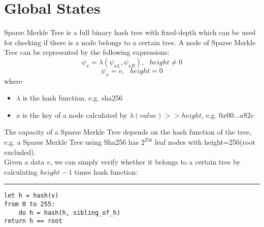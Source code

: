 \documentclass[a4paper,12pt]{article}
\begin{document}
\section{Global States}
\label{sec:org9b71832}
Sparse Merkle Tree is a full binary hash tree with fixed-depth which can be used for checking if there is a node belongs to a certain tree. A node of Sparse Merkle Tree can be represented by the following expressions:\\
\begin{equation*}
    \psi_{x} = \lambda(\psi_{xL}, \psi_{xR}), \text{ } height \ne 0
\end{equation*}
\begin{equation*}
    \psi_{x} = v, \text{ } height = 0
\end{equation*}
where\\
\begin{itemize}
    \item $\lambda$ is the hash function, e.g. sha256
    \item $x$ is the key of a node calculated by $\lambda(value) >> height$, e.g. $0x00...a82e$
\end{itemize}
The capacity of a Sparse Merkle Tree depends on the hash function of the tree, e.g. a Sparse Merkle Tree using Sha256 has \(2^{256}\) leaf nodes with height=256(root excluded).\\
Given a data \(v\), we can simply verify whether it belongs to a certain tree by calculating \(height-1\) times hash function:\\

\noindent\rule{\textwidth}{0.5pt}
\begin{verbatim}
let h = hash(v)
from 0 to 255:
    do h = hash(h, sibling_of_h)
return h == root
\end{verbatim}
\end{document}
